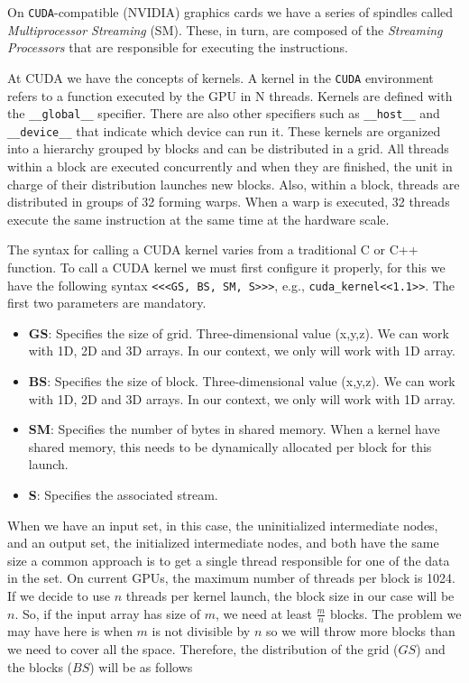 \documentclass[titlepage,12pt]{report}
\begin{document}
On \texttt{CUDA}-compatible (NVIDIA) graphics cards we have a series of spindles called \textit{Multiprocessor Streaming} (SM). These, in turn, are composed of the \textit{Streaming Processors} that are responsible for executing the instructions.

At CUDA we have the concepts of kernels. A kernel in the \texttt{CUDA} environment refers to a function executed by the GPU in N threads. Kernels are defined with the \lstinline|__global__| specifier. There are also other specifiers such as \lstinline|__host__| and \lstinline|__device__| that indicate which device can run it. These kernels are organized into a hierarchy grouped by blocks and can be distributed in a grid. All threads within a block are executed concurrently and when they are finished, the unit in charge of their distribution launches new blocks. Also, within a block, threads are distributed in groups of 32 forming warps. When a warp is executed, 32 threads execute the same instruction at the same time at the hardware scale.

The syntax for calling a CUDA kernel varies from a traditional C or C++ function. To call a CUDA kernel we must first configure it properly, for this we have the following syntax \lstinline|<<<GS, BS, SM, S>>>|, e.g., \lstinline|cuda_kernel<<1.1>>|. The first two parameters are mandatory.

\begin{itemize}

\item \textbf{GS}: Specifies the size of grid. Three-dimensional value (x,y,z). We can work with 1D, 2D and 3D arrays. In our context, we only will work with 1D array.
\item \textbf{BS}: Specifies the size of block. Three-dimensional value (x,y,z). We can work with 1D, 2D and 3D arrays. In our context, we only will work with 1D array.
\item \textbf{SM}: Specifies the number of bytes in shared memory. When a kernel have shared memory, this needs to be dynamically allocated per block for this launch.
\item \textbf{S}: Specifies the associated stream.

\end{itemize}

When we have an input set, in this case, the uninitialized intermediate nodes, and an output set, the initialized intermediate nodes, and both have the same size a common approach is to get a single thread responsible for one of the data in the set. On current GPUs, the maximum number of threads per block is 1024. If we decide to use $n$ threads per kernel launch, the block size in our case will be $n$. So, if the input array has size of $m$, we need at least $\frac{m}{n}$ blocks. The problem we may have here is when $m$ is not divisible by $n$ so we will throw more blocks than we need to cover all the space. Therefore, the distribution of the grid ($GS$) and the blocks ($BS$) will be as follows
\end{document}
